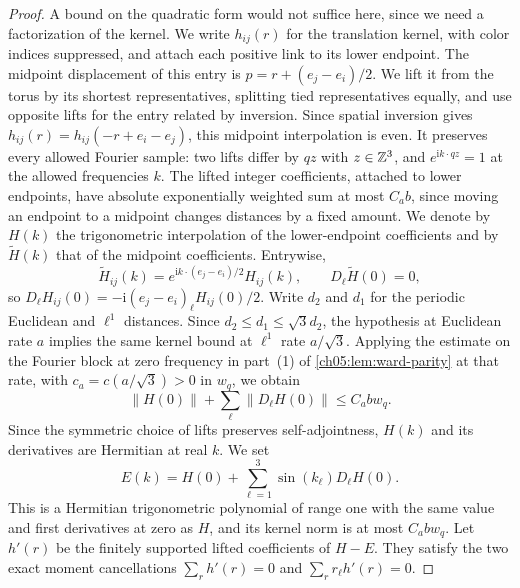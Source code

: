 \begin{proof}
A bound on the quadratic form would not suffice here, since we need a factorization of the kernel. We write $h_{ij}(r)$ for the translation kernel, with color indices suppressed, and attach each positive link to its lower endpoint. The midpoint displacement of this entry is $p=r+(e_j-e_i)/2$. We lift it from the torus by its shortest representatives, splitting tied representatives equally, and use opposite lifts for the entry related by inversion. Since spatial inversion gives $h_{ij}(r)=h_{ij}(-r+e_i-e_j)$, this midpoint interpolation is even. It preserves every allowed Fourier sample: two lifts differ by $qz$ with $z\in\mathbb Z^3$, and $e^{\mathrm ik\cdot qz}=1$ at the allowed frequencies $k$. The lifted integer coefficients, attached to lower endpoints, have absolute exponentially weighted sum at most $C_ab$, since moving an endpoint to a midpoint changes distances by a fixed amount. We denote by $H(k)$ the trigonometric interpolation of the lower-endpoint coefficients and by $\widetilde H(k)$ that of the midpoint coefficients. Entrywise,
\[
 \widetilde H_{ij}(k)=e^{\mathrm ik\cdot(e_j-e_i)/2}H_{ij}(k),\qquad
 D_\ell\widetilde H(0)=0,
\]
so $D_\ell H_{ij}(0)=-\mathrm i(e_j-e_i)_\ell H_{ij}(0)/2$. Write $d_2$ and $d_1$ for the periodic Euclidean and $\ell^1$ distances. Since $d_2\le d_1\le\sqrt3d_2$, the hypothesis at Euclidean rate $a$ implies the same kernel bound at $\ell^1$ rate $a/\sqrt3$. Applying the estimate on the Fourier block at zero frequency in part~(1) of \cref{ch05:lem:ward-parity} at that rate, with $c_a=c(a/\sqrt3)>0$ in $w_q$, we obtain
\begin{equation}\label{ch08:eq:small-two-jets}
 \|H(0)\|+\sum_\ell\|D_\ell H(0)\|\le C_abw_q.
\end{equation}
Since the symmetric choice of lifts preserves self-adjointness, $H(k)$ and its derivatives are Hermitian at real $k$. We set
\[
 E(k)=H(0)+\sum_{\ell=1}^3\sin(k_\ell)D_\ell H(0).
\]
This is a Hermitian trigonometric polynomial of range one with the same value and first derivatives at zero as $H$, and its kernel norm is at most $C_abw_q$. Let $h'(r)$ be the finitely supported lifted coefficients of $H-E$. They satisfy the two exact moment cancellations $\sum_rh'(r)=0$ and $\sum_rr_\ell h'(r)=0$.


\end{proof}
